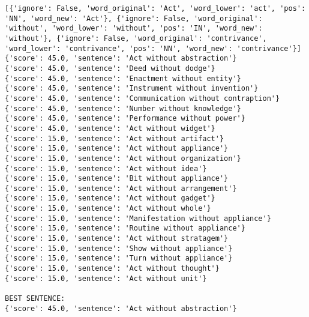 \documentclass[12pt,a4paper,oneside]{book}
\begin{document}
\begin{verbatim}
[{'ignore': False, 'word_original': 'Act', 'word_lower': 'act', 'pos': 'NN', 'word_new': 'Act'}, {'ignore': False, 'word_original': 'without', 'word_lower': 'without', 'pos': 'IN', 'word_new': 'without'}, {'ignore': False, 'word_original': 'contrivance', 'word_lower': 'contrivance', 'pos': 'NN', 'word_new': 'contrivance'}]
{'score': 45.0, 'sentence': 'Act without abstraction'}
{'score': 45.0, 'sentence': 'Deed without dodge'}
{'score': 45.0, 'sentence': 'Enactment without entity'}
{'score': 45.0, 'sentence': 'Instrument without invention'}
{'score': 45.0, 'sentence': 'Communication without contraption'}
{'score': 45.0, 'sentence': 'Number without knowledge'}
{'score': 45.0, 'sentence': 'Performance without power'}
{'score': 45.0, 'sentence': 'Act without widget'}
{'score': 15.0, 'sentence': 'Act without artifact'}
{'score': 15.0, 'sentence': 'Act without appliance'}
{'score': 15.0, 'sentence': 'Act without organization'}
{'score': 15.0, 'sentence': 'Act without idea'}
{'score': 15.0, 'sentence': 'Bit without appliance'}
{'score': 15.0, 'sentence': 'Act without arrangement'}
{'score': 15.0, 'sentence': 'Act without gadget'}
{'score': 15.0, 'sentence': 'Act without whole'}
{'score': 15.0, 'sentence': 'Manifestation without appliance'}
{'score': 15.0, 'sentence': 'Routine without appliance'}
{'score': 15.0, 'sentence': 'Act without stratagem'}
{'score': 15.0, 'sentence': 'Show without appliance'}
{'score': 15.0, 'sentence': 'Turn without appliance'}
{'score': 15.0, 'sentence': 'Act without thought'}
{'score': 15.0, 'sentence': 'Act without unit'}

BEST SENTENCE:
{'score': 45.0, 'sentence': 'Act without abstraction'}



\end{verbatim}
\end{document}
